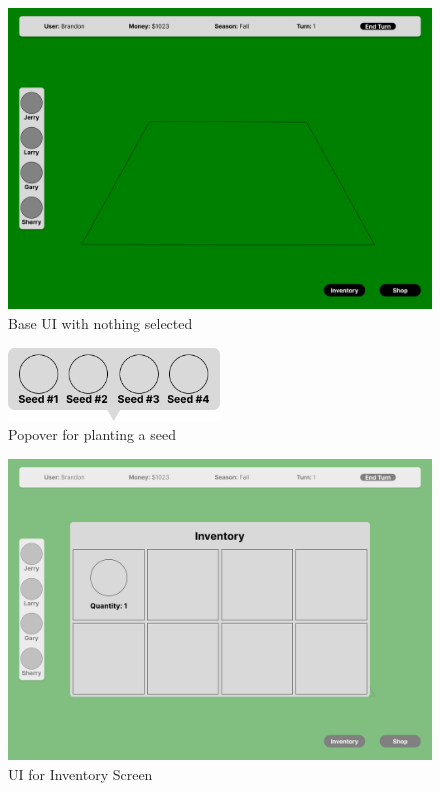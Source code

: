 \documentclass[12pt, titlepage]{article}
\begin{document}
\begin{figure}[H]
\centering
\includegraphics[width=1\textwidth]{main.png}
\caption{Base UI with nothing selected}
\label{FigUH}
\end{figure}

\begin{figure}[H]
\centering
\includegraphics[width=0.5\textwidth]{plant.png}
\caption{Popover for planting a seed}
\label{FigUH}
\end{figure}

\begin{figure}[H]
\centering
\includegraphics[width=1\textwidth]{inv.png}
\caption{UI for Inventory Screen}
\label{FigUH}
\end{figure}
\end{document}
